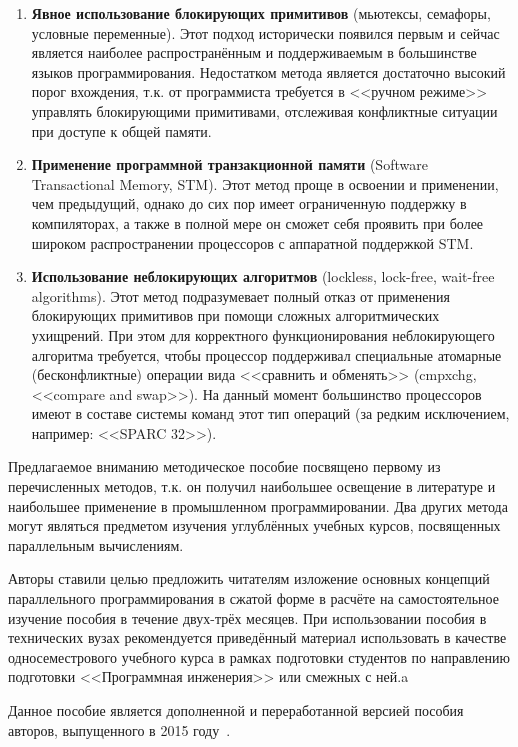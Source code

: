 \begin{enumerate}
    \sloppy
    \item\textbf{Явное использование блокирующих примитивов} (мьютексы, семафоры, условные переменные).
    Этот подход исторически появился первым и сейчас является наиболее распространённым и поддерживаемым в большинстве языков программирования.
    Недостатком метода является достаточно высокий порог вхождения, т.к. от программиста требуется в <<ручном режиме>> управлять блокирующими примитивами, отслеживая конфликтные ситуации при доступе к общей памяти.
    \item\textbf{Применение программной транзакционной памяти} (Software Transactional Memory, STM).
    Этот метод проще в освоении и применении, чем предыдущий, однако до сих пор имеет ограниченную поддержку в компиляторах, а также в полной мере он сможет себя проявить при более широком распространении процессоров с аппаратной поддержкой STM\@.
    \item\textbf{Использование неблокирующих алгоритмов} (lockless, lock-free, wait-free algorithms).
    Этот метод подразумевает полный отказ от применения блокирующих примитивов при помощи сложных алгоритмических ухищрений.
    При этом для корректного функционирования неблокирующего алгоритма требуется, чтобы процессор поддерживал специальные атомарные (бесконфликтные) операции вида <<сравнить и обменять>> (cmpxchg, <<compare and swap>>).
    На данный момент большинство процессоров имеют в составе системы команд этот тип операций (за редким исключением, например: <<SPARC 32>>).
\end{enumerate}

Предлагаемое вниманию методическое пособие посвящено первому из перечисленных методов, т.к. он получил наибольшее освещение в литературе и наибольшее применение в промышленном программировании.
Два других метода могут являться предметом изучения углублённых учебных курсов, посвященных параллельным вычислениям.

Авторы ставили целью предложить читателям изложение основных концепций параллельного программирования в сжатой форме в расчёте на самостоятельное изучение пособия в течение двух-трёх месяцев.
При использовании пособия в технических вузах рекомендуется приведённый материал использовать в качестве односеместрового учебного курса в рамках подготовки студентов по направлению подготовки <<Программная инженерия>> или смежных с ней.a

Данное пособие является дополненной и переработанной версией пособия авторов, выпущенного в 2015 году~\cite{SosninBalakshin2015}.